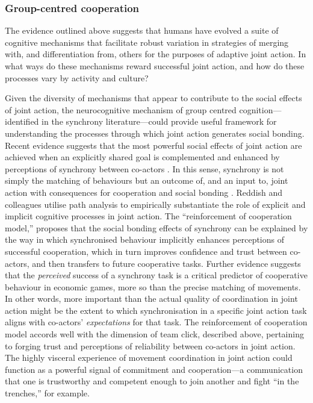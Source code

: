 \subsubsection{Group-centred cooperation}
The evidence outlined above suggests that humans have evolved a suite of cognitive mechanisms that facilitate robust variation in strategies of merging with, and differentiation from, others for the purposes of adaptive joint action. In what ways do these mechanisms reward successful joint action, and how do these processes vary by activity and culture?

Given the diversity of mechanisms that appear to contribute to the social effects of joint action, the neurocognitive mechanism of group centred cognition---identified in the synchrony literature---could provide useful framework for understanding the processes through which joint action generates social bonding.  Recent evidence suggests that the most powerful social effects of joint action are achieved when an explicitly shared goal is complemented and enhanced by perceptions of synchrony between co-actors \citep{Frith2010,Reddish2013}.
In this sense, synchrony is not simply the matching of behaviours but an outcome of, and an input to, joint action with consequences for cooperation and social bonding \citep{Keller2014,Lumsden2012,Obhi2011}.
Reddish and colleagues \textcite{Reddish2013} utilise path analysis to empirically substantiate the role of explicit and implicit cognitive processes in joint action.
The ``reinforcement of cooperation model,'' proposes that the social bonding effects of synchrony can be explained by the way in which synchronised behaviour  implicitly enhances perceptions of successful cooperation, which in turn improves confidence and trust between co-actors, and then transfers to future cooperative tasks.  Further evidence suggests that the \textit{perceived} success of a synchrony task is a critical predictor of cooperative behaviour in economic games, more so than the precise matching of movements\citep{Kurzban2001,Launay2013}.  In other words, more important than the actual quality of coordination in joint action might be the extent to which synchronisation in a specific joint action task aligns with co-actors' \textit{expectations} for that task.  The reinforcement of cooperation model accords well with the dimension of team click, described above, pertaining to forging trust and perceptions of reliability between co-actors in joint action.
The highly visceral experience of movement coordination in joint action could function as a powerful signal of commitment and cooperation---a communication that one is trustworthy and competent enough to join another and fight ``in the trenches,'' for example.


